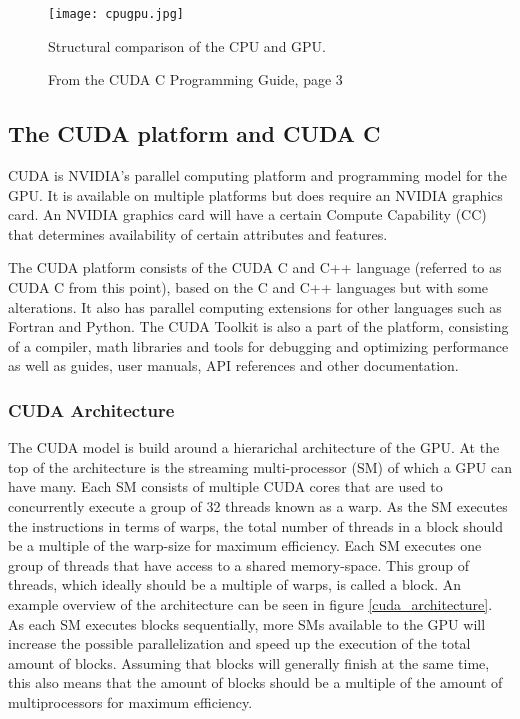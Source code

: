 \begin{figure}[H]
\texttt{[image: cpugpu.jpg]}
\caption{Structural comparison of the CPU and GPU.\label{cpugpu}}
\caption*{From the CUDA C Programming Guide, page 3 \cite{nvidia2014programming}}
\end{figure}

\subsection{The CUDA platform and CUDA C}\label{subsec:background:cudac}
CUDA is NVIDIA's parallel computing platform and programming model for the GPU.
It is available on multiple platforms but does require an NVIDIA graphics card. 
An NVIDIA graphics card will have a certain Compute Capability (CC) that determines availability of certain attributes and features.

The CUDA platform consists of the CUDA C and C++ language (referred to as CUDA C from this point), based on the C and C++ languages but with some alterations.
It also has parallel computing extensions for other languages such as Fortran and Python.
The CUDA Toolkit is also a part of the platform, consisting of a compiler, math libraries and tools for debugging and optimizing performance as well as guides, user manuals, API references and other documentation.

\subsubsection{CUDA Architecture}
The CUDA model is build around a hierarichal architecture of the GPU. 
At the top of the architecture is the streaming multi-processor (SM) of which a GPU can have many. 
Each SM consists of multiple CUDA cores that are used to concurrently execute a group of 32 threads known as a warp. 
As the SM executes the instructions in terms of warps, the total number of threads in a block should be a multiple of the warp-size for maximum efficiency.
Each SM executes one group of threads that have access to a shared memory-space.
This group of threads, which ideally should be a multiple of warps, is called a block. 
An example overview of the architecture can be seen in figure \ref{cuda_architecture}.
As each SM executes blocks sequentially, more SMs available to the GPU will increase the possible parallelization and speed up the execution of the total amount of blocks. 
Assuming that blocks will generally finish at the same time, this also means that the amount of blocks should be a multiple of the amount of multiprocessors for maximum efficiency.

